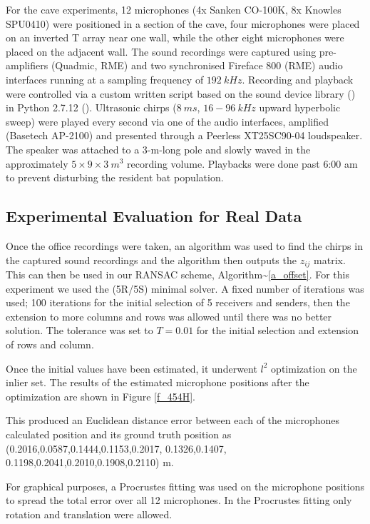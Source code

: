 \documentclass[
]{book}
\begin{document}
For the cave experiments, 12 microphones (4x Sanken CO-100K, 8x Knowles SPU0410) were positioned in a section of the cave, four microphones were placed on an inverted T array near one wall, while the other eight microphones were placed on the adjacent wall. The sound recordings were captured using pre-amplifiers (Quadmic, RME) and two synchronised Fireface 800 (RME) audio interfaces running at a sampling frequency of \(192 ~kHz\). Recording and playback were controlled via a custom written script based on the sound device library
(\cite{geier2015a}) in Python 2.7.12 (\cite{van1995python}). Ultrasonic chirps (\(8~ms\), \(16-96~kHz\) upward hyperbolic sweep) were played every second via one of the audio interfaces, amplified (Basetech AP-2100) and presented through a Peerless XT25SC90-04 loudspeaker. The speaker was attached to a 3-m-long pole and slowly waved in the approximately \(5 \times 9 \times 3 ~m^3\) recording volume. Playbacks were done past 6:00 am to prevent disturbing the resident bat population.

\vspace{-5pt}
\subsection{Experimental Evaluation for Real Data}
\vspace{-5pt}

Once the office recordings were taken, an algorithm was used to find the chirps in the captured sound recordings and the algorithm then outputs the \(z_{ij}\) matrix. This can then be used in our RANSAC scheme, Algorithm\textasciitilde{}\ref{a_offset}. For this experiment we used the (5R/5S) minimal solver. A fixed number of iterations was used; 100 iterations for the initial selection of 5 receivers and senders, then the extension to more columns and rows was allowed until there was no better solution. The tolerance was set to \(T=0.01\) for the initial selection and extension of rows and column.

Once the initial values have been estimated, it underwent \(l^{2}\) optimization on the inlier set. The results of the estimated microphone positions after the optimization are shown in Figure \ref{f_454H}.

This produced an Euclidean distance error between each of the microphones calculated position and its ground truth position as (0.2016,0.0587,0.1444,0.1153,0.2017, 0.1326,0.1407, 0.1198,0.2041,0.2010,0.1908,0.2110) m.

For graphical purposes, a Procrustes fitting was used on the microphone positions to spread the total error over all 12 microphones. In the Procrustes fitting only rotation and translation were allowed.
\end{document}
